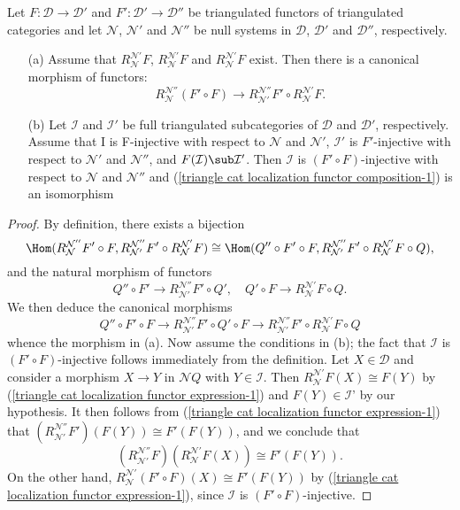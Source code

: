 \begin{proposition}\label{triangle cat localization functor composition}
Let $F:\mathcal{D}\to\mathcal{D}'$ and $F':\mathcal{D}'\to\mathcal{D}''$ be triangulated functors of triangulated categories and let $\mathcal{N}$, $\mathcal{N}'$ and $\mathcal{N}''$ be null systems in $\mathcal{D}$, $\mathcal{D}'$ and $\mathcal{D}''$, respectively.
\begin{enumerate}
    \item[(a)] Assume that $R_\mathcal{N}^{\mathcal{N}'}F$, $R_\mathcal{N}^{\mathcal{N}'}F$ and $R_\mathcal{N}^{\mathcal{N}'}F$ exist. Then there is a canonical morphism of functors:
    \begin{equation}\label{triangle cat localization functor composition-1}
    R_\mathcal{N}^{\mathcal{N}''}(F'\circ F) \to R_{\mathcal{N}'}^{\mathcal{N}''}F'\circ R_\mathcal{N}^{\mathcal{N}'}F.
    \end{equation}
    \item[(b)] Let $\mathcal{I}$ and $\mathcal{I}'$ be full triangulated subcategories of $\mathcal{D}$ and $\mathcal{D}'$, respectively. Assume that I is F-injective with respect to $\mathcal{N}$ and $\mathcal{N}'$, $\mathcal{I}'$ is $F'$-injective with respect to $\mathcal{N}'$ and $\mathcal{N}''$, and $F(\mathcal{I})\sub\mathcal{I}'$. Then $\mathcal{I}$ is $(F'\circ F)$-injective with respect to $\mathcal{N}$ and $\mathcal{N}''$ and (\ref{triangle cat localization functor composition-1}) is an isomorphism
\end{enumerate}
\end{proposition}
\begin{proof}
By definition, there exists a bijection
\[\Hom(R_\mathcal{N}^{\mathcal{N}''}F'\circ F,R_{\mathcal{N}'}^{\mathcal{N}''}F'\circ R_{\mathcal{N}}^{\mathcal{N}'}F)\cong\Hom(Q''\circ F'\circ F,R_\mathcal{N'}^{\mathcal{N}''}F'\circ R_{\mathcal{N}}^{\mathcal{N}'}F\circ Q),\]
and the natural morphism of functors
\[Q''\circ F'\to R_{\mathcal{N}'}^{\mathcal{N}''}F'\circ Q',\quad Q'\circ F\to R_{\mathcal{N}}^{\mathcal{N}'}F\circ Q.\]
We then deduce the canonical morphisms
\[Q''\circ F'\circ F\to R_{\mathcal{N}'}^{\mathcal{N}''}F'\circ Q'\circ F\to R_{\mathcal{N}'}^{\mathcal{N}''}F'\circ R_{\mathcal{N}}^{\mathcal{N}'}F\circ Q\]
whence the morphism in (a). Now assume the conditions in (b); the fact that $\mathcal{I}$ is $(F'\circ F)$-injective follows immediately from the definition. Let $X\in\mathcal{D}$ and consider a morphism $X\to Y$ in $\mathcal{N}Q$ with $Y\in\mathcal{I}$. Then $R_{\mathcal{N}}^{\mathcal{N}'}F(X)\cong F(Y)$ by (\ref{triangle cat localization functor expression-1}) and $F(Y)\in\mathcal{I}$' by our hypothesis. It then follows from (\ref{triangle cat localization functor expression-1}) that $(R_{\mathcal{N}'}^{\mathcal{N}''}F')(F(Y))\cong F'(F(Y))$, and we conclude that
\[(R_{\mathcal{N}'}^{\mathcal{N}''}F)(R_{\mathcal{N}}^{\mathcal{N}'}F(X))\cong F'(F(Y)).\]
On the other hand, $R_\mathcal{N}^{\mathcal{N}'}(F'\circ F)(X)\cong F'(F(Y))$ by (\ref{triangle cat localization functor expression-1}), since $\mathcal{I}$ is $(F'\circ F)$-injective.
\end{proof}

